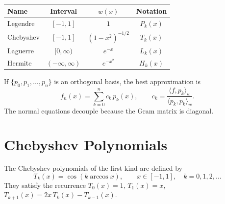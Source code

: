 \begin{example}
\label{ex:classical-orthogonal}
\begin{center}
\begin{tabular}{lccc}
    \toprule
    \textbf{Name} & \textbf{Interval} & $w(x)$ & \textbf{Notation} \\
    \midrule
    Legendre     & $[-1,1]$          & $1$                   & $P_k(x)$ \\
    Chebyshev    & $[-1,1]$          & $(1-x^2)^{-1/2}$     & $T_k(x)$ \\
    Laguerre     & $[0,\infty)$      & $e^{-x}$             & $L_k(x)$ \\
    Hermite      & $(-\infty,\infty)$& $e^{-x^2}$           & $H_k(x)$ \\
    \bottomrule
\end{tabular}
\end{center}
\end{example}

\begin{proposition}
\label{prop:ls-orthogonal}
If $\{p_0, p_1, \ldots, p_n\}$ is an orthogonal basis, the best approximation is
\[
    f_n(x) = \sum_{k=0}^{n} c_k\, p_k(x), \qquad c_k = \frac{\langle f, p_k \rangle_w}{\langle p_k, p_k \rangle_w}.
\]
The normal equations decouple because the Gram matrix is diagonal.
\end{proposition}

\section{Chebyshev Polynomials}

\begin{definition}
\label{def:chebyshev}
The Chebyshev polynomials of the first kind are defined by
\[
    T_k(x) = \cos(k \arccos x), \qquad x \in [-1,1], \quad k = 0, 1, 2, \ldots
\]
They satisfy the recurrence $T_0(x)=1$, $T_1(x)=x$, $T_{k+1}(x) = 2x\,T_k(x) - T_{k-1}(x)$.
\end{definition}

